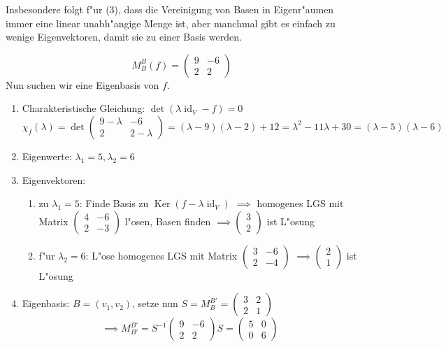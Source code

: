 \documentclass[oneside,fontsize=11pt,paper=a4,BCOR=0mm,DIV=12,automark,headsepline]{scrbook}
\newcommand{\gq}[1]{\glqq{}#1\grqq{}} %
\DeclareMathOperator{\mKer}{Ker}
\DeclareMathOperator{\mId}{id}
\theoremstyle{remark}
\theoremstyle{definition}
\theoremstyle{definition}
\theoremstyle{remark}
\begin{document}
Insbesondere folgt f"ur (3), dass die Vereinigung von Basen in Eigenr"aumen immer eine linear unabh"angige Menge ist, aber manchmal gibt es einfach \gq{zu wenige} Eigenvektoren, damit sie zu einer Basis werden.
\begin{exa}[Eigenwertberechnung]
  \[M^B_B(f) =
    \begin{pmatrix}
      9 & -6 \\
      2 & 2
    \end{pmatrix}\]
  Nun suchen wir eine Eigenbasis von \(f\).
  \begin{enumerate}
  \item Charakteristische Gleichung: \(\det(\lambda\mId_V-f)=0\)
    \[\chi_f(\lambda) = \det\begin{pmatrix}9-\lambda & -6 \\ 2 & 2-\lambda\end{pmatrix} = (\lambda - 9)(\lambda - 2) + 12 = \lambda^2 - 11\lambda + 30 = (\lambda-5)(\lambda-6)\]
  \item Eigenwerte: \(\lambda_1 = 5, \lambda_2 = 6\)
  \item Eigenvektoren:
    \begin{enumerate}
    \item zu \(\lambda_1 = 5\): Finde Basis zu \(\mKer(f - \lambda\mId_V)\) \(\implies\) homogenes LGS mit Matrix \(
      \begin{pmatrix}
        4 & -6 \\
        2 & -3
      \end{pmatrix}
      \) l"osen, Basen finden \(\implies\begin{pmatrix}3\\2\end{pmatrix}\) ist L"osung
    \item f"ur \(\lambda_2 = 6\): L"ose homogenes LGS mit Matrix \(
      \begin{pmatrix}
        3 & -6 \\
        2 & -4
      \end{pmatrix}
      \) \(\implies\begin{pmatrix}2\\1\end{pmatrix}\) ist L"osung
    \end{enumerate}
  \item Eigenbasis: \(B = (v_1, v_2)\), setze nun \(S = M^{B'}_B=\begin{pmatrix}3 & 2\\ 2 & 1\end{pmatrix}\)
    \[\implies M^{B'}_{B'}=S^{-1}\begin{pmatrix}9 & -6 \\ 2 & 2 \end{pmatrix}S = \begin{pmatrix}5 & 0 \\ 0 & 6 \end{pmatrix}\]
  \end{enumerate}
\end{exa}
\end{document}
